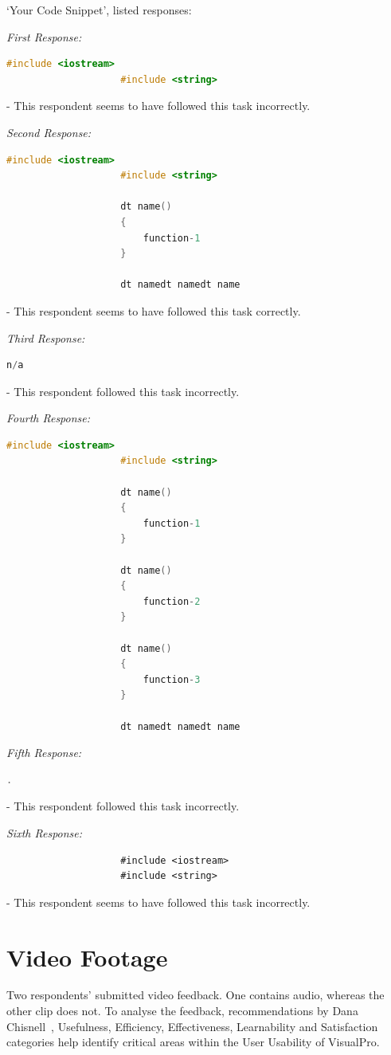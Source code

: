 \documentclass[12pt]{report} %
\begin{document}
				`Your Code Snippet', listed responses:

				\textit{First Response:}
				\begin{lstlisting}[language=c++]
					#include <iostream>
					#include <string>
				\end{lstlisting} - This respondent seems to have followed this task incorrectly.

				\textit{Second Response:}
				\begin{lstlisting}[language=c++]
					#include <iostream>
					#include <string>

					dt name()
					{
						function-1
					}

					dt namedt namedt name
				\end{lstlisting} - This respondent seems to have followed this task correctly.

				\textit{Third Response:}
				\begin{lstlisting}[language=c++]
					n/a			
				\end{lstlisting} - This respondent followed this task incorrectly.

				\textit{Fourth Response:}
				\begin{lstlisting}[language=c++]
					#include <iostream>
					#include <string>

					dt name()
					{
						function-1
					}

					dt name()
					{
						function-2
					}

					dt name()
					{
						function-3
					}

					dt namedt namedt name
				\end{lstlisting}

				\textit{Fifth Response:}
				\begin{lstlisting}[language=c++]
					.
				\end{lstlisting} - This respondent followed this task incorrectly.

				\textit{Sixth Response:}
				\begin{lstlisting}
					#include <iostream>
					#include <string>
				\end{lstlisting} - This respondent seems to have followed this task incorrectly.

		\section{Video Footage}
			Two respondents' submitted video feedback. One contains audio, whereas the other clip does not. To analyse the feedback, recommendations by Dana Chisnell~\cite{chisnell_dana_handbook_2008}, Usefulness, Efficiency, Effectiveness, Learnability and Satisfaction categories help identify critical areas within the User Usability of VisualPro.
\end{document}
